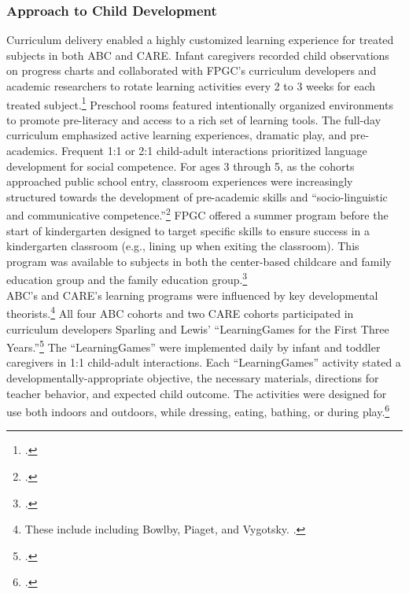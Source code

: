\subsubsection{Approach to Child Development}
\noindent Curriculum delivery enabled a highly customized learning experience for treated subjects in both ABC and CARE. Infant caregivers recorded child observations on progress charts and collaborated with FPGC's curriculum developers and academic researchers to rotate learning activities every 2 to 3 weeks for each treated subject.\footnote{\citet{Ramey_Collier_etal_1976_CarolinaAbecedarianProject,Campbell_Ramey_1994_CD}.} Preschool rooms featured intentionally organized environments to promote pre-literacy and access to a rich set of learning tools. The full-day curriculum emphasized active learning experiences, dramatic play, and pre-academics. Frequent 1:1 or 2:1 child-adult interactions prioritized language development for social competence. For ages 3 through 5, as the cohorts approached public school entry, classroom experiences were increasingly structured  towards the development of pre-academic skills and ``socio-linguistic and communicative competence.''\footnote{\citet{Ramey-et-al_1977_Intro-to-ABC, Haskins_1985_CD, Ramey_1981_Modification, Ramey_Campbell_1979_SR, Ramey_Smith_1977_AJMD, Ramey_McGinness_etal_1982_Abecedarianapproach, Sparling_Lewis_1979_BOOKLearninggamesFirstThree,Sparling_Lewis_1984_BOOKLearningGamesThreesFours}.} FPGC offered a summer program before the start of kindergarten designed to target specific skills to ensure success in a kindergarten classroom (e.g., lining up when exiting the classroom). This program was available to subjects in both the center-based childcare and family education group and the family education group.\footnote{\citet{Ramey_etal_1985_Project-CARE_TiECSE}.} \\

\noindent ABC's and CARE's learning programs were influenced by key developmental theorists.\footnote{These include including Bowlby, Piaget, and Vygotsky. \citep{Sparling_1974_Synth_Edu_Infant_SPEECH,Mcginness_1981_Developing,abc2014-2015interviews}.} All four ABC cohorts and two CARE cohorts participated in curriculum developers Sparling and Lewis' ``LearningGames for the First Three Years.''\footnote{ \citet{Sparling_Lewis_1979_BOOKLearninggamesFirstThree}.} The ``LearningGames'' were implemented daily by infant and toddler caregivers in 1:1 child-adult interactions. Each ``LearningGames'' activity stated a developmentally-appropriate objective, the necessary materials, directions for teacher behavior, and expected child outcome. The activities were designed for use both indoors and outdoors, while dressing, eating, bathing, or during play.\footnote{\citet{Ramey_Campbell_1979_SR, Ramey_1981_Modification,Sparling_Lewis_1979_BOOKLearninggamesFirstThree}.}\\

